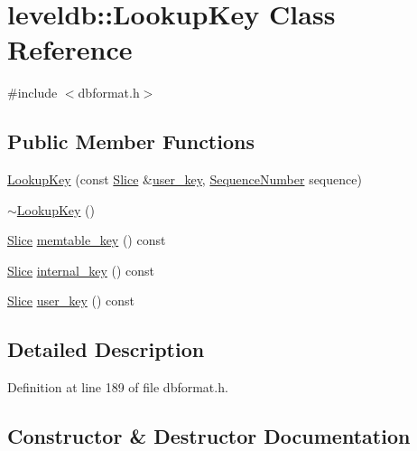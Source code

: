 \hypertarget{classleveldb_1_1_lookup_key}{}\section{leveldb\+:\+:Lookup\+Key Class Reference}
\label{classleveldb_1_1_lookup_key}


{\ttfamily \#include $<$dbformat.\+h$>$}

\subsection*{Public Member Functions}
\begin{DoxyCompactItemize}
\item 
\hyperlink{classleveldb_1_1_lookup_key_acd09aa56607ced962e1b458d05d53472}{Lookup\+Key} (const \hyperlink{classleveldb_1_1_slice}{Slice} \&\hyperlink{classleveldb_1_1_lookup_key_adf91e9804383dd1b2bfd8545df45342f}{user\+\_\+key}, \hyperlink{namespaceleveldb_a5481ededd221c36d652c371249f869fa}{Sequence\+Number} sequence)
\item 
\hyperlink{classleveldb_1_1_lookup_key_a1ed5751c159540217aa5d702fdf83a98}{$\sim$\+Lookup\+Key} ()
\item 
\hyperlink{classleveldb_1_1_slice}{Slice} \hyperlink{classleveldb_1_1_lookup_key_a16b7ee6c701da7e7503510880a106a3a}{memtable\+\_\+key} () const 
\item 
\hyperlink{classleveldb_1_1_slice}{Slice} \hyperlink{classleveldb_1_1_lookup_key_a3578de91f795e450b05a870795339b40}{internal\+\_\+key} () const 
\item 
\hyperlink{classleveldb_1_1_slice}{Slice} \hyperlink{classleveldb_1_1_lookup_key_adf91e9804383dd1b2bfd8545df45342f}{user\+\_\+key} () const 
\end{DoxyCompactItemize}


\subsection{Detailed Description}


Definition at line 189 of file dbformat.\+h.



\subsection{Constructor \& Destructor Documentation}
\hypertarget{classleveldb_1_1_lookup_key_acd09aa56607ced962e1b458d05d53472}{}
